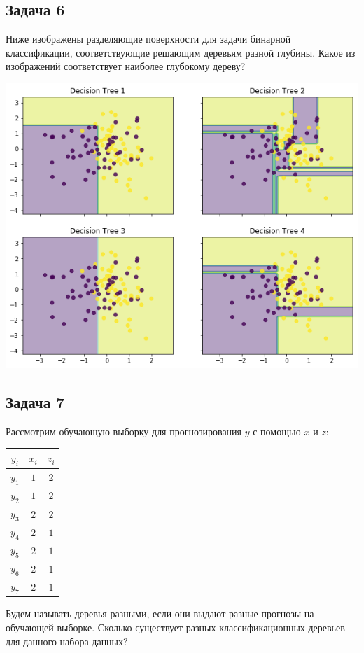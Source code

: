 \documentclass[12pt, a4paper, oneside]{article}
\begin{document}
\subsection*{Задача 6} 

Ниже изображены разделяющие поверхности для задачи бинарной классификации, соответствующие решающим деревьям разной глубины. Какое из изображений соответствует наиболее глубокому дереву?

\begin{center}
	\includegraphics[scale=0.7]{trees.png}
\end{center}


\subsection*{Задача 7} 

Рассмотрим обучающую выборку для прогнозирования $y$ с помощью $x$ и $z$:

\begin{center}
\begin{tabular}{c|c|c}
	\hline
	$y_i$ & $x_i$ & $z_i$ \\
\hline
	$y_1$ & $1$ & $2$ \\
	$y_2$ & $1$ & $2$ \\
	$y_3$ & $2$ & $2$ \\
	$y_4$ & $2$ & $1$\\
	$y_5$ & $2$ & $1$ \\
	$y_6$ & $2$ & $1$ \\
	$y_7$ & $2$ & $1$ \\
\end{tabular}
\end{center}

Будем называть деревья разными, если они выдают разные прогнозы на обучающей выборке.
Сколько существует разных классификационных деревьев  для данного набора данных?
\end{document}
